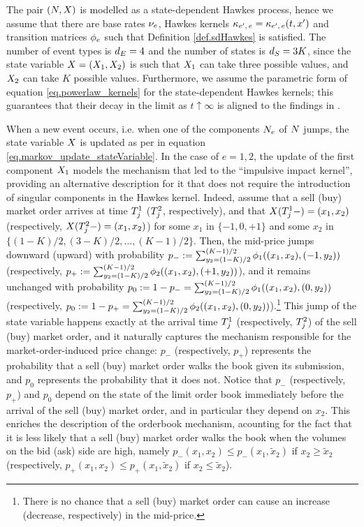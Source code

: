 \documentclass[10pt]{article}
\begin{document}
The pair $(\multiCountingProc, \stateVariable)$ is modelled as a state-dependent Hawkes process, hence we assume that there are base rates $\baseRate_e$, Hawkes kernels $\hawkesKernel\subscriptee=\hawkesKernel\subscriptee(t, \xone)$ and transition matrices $\transProb_e$ such that  Definition \ref{def.sdHawkes} is satisfied. The number of event types is $\numEventTypes = 4$ and the number of states is $\numStates = 3K$, since the state variable $\stateVariable = (\stateVariable_1, \stateVariable_2)$ is such that $\stateVariable_1$ can take three possible values, and $\stateVariable_2$ can take $K$ possible values. Furthermore, we assume the parametric form of equation \eqref{eq.powerlaw_kernels} for the state-dependent Hawkes kernels; this guarantees that their decay in the limit as $t\uparrow\infty$ is aligned to the findings in \citealp{BM14haw}. 

When a new event occurs, i.e. when one of the components $\countingProc$ of $\multiCountingProc$ jumps, the state variable $\stateVariable$ is updated as per in equation \eqref{eq.markov_update_stateVariable}. In the case of $e=1,2$, the update of the first component $\stateVariable_1$ models the mechanism that led to the ``impulsive impact kernel'', providing an alternative description for it that does not require the introduction of singular components in the Hawkes kernel. Indeed, assume that a sell (buy) market order arrives at time $\arrivalTimes[1]_j$ ($\arrivalTimes[2]_j$, respectively), and that $\stateVariable(\arrivalTimes[1]_j -) = (x_1,x_2)$ (respectively, $\stateVariable(\arrivalTimes[2]_j -) = (x_1,x_2)$) for some $x_1$ in $\lbrace -1, 0, +1\rbrace$ and some $x_2$ in $\lbrace (1-K)/2, (3-K)/2, \dots, (K-1)/2 \rbrace$. Then, the mid-price jumps downward (upward) with probability $p_{-}:=\sum_{y_2 = (1-K)/2}^{(K-1)/2} \transProb_{1}((x_1, x_2), (-1,y_2))$ (respectively, $p_{+}:=\sum_{y_2 = (1-K)/2}^{(K-1)/2} \transProb_{2}((x_1, x_2), (+1,y_2))$), and it remains unchanged with probability $p_{0}:=1-p_{-}=\sum_{y_2 = (1-K)/2}^{(K-1)/2} \transProb_{1}((x_1, x_2), (0,y_2))$  (respectively, $p_{0}:=1-p_{+}=\sum_{y_2 = (1-K)/2}^{(K-1)/2} \transProb_{2}((x_1, x_2), (0,y_2))$).\footnote{ There is no chance that a sell (buy) market order can cause an increase (decrease, respectively) in the mid-price.} This jump of the state variable happens exactly at the arrival time $\arrivalTimes[1]_j$ (respectively, $\arrivalTimes[2]_j$)  of the sell (buy) market order, and it naturally captures the mechanism responsible for the market-order-induced price change: $p_{-}$ (respectively, $p_{+}$) represents the probability that a sell (buy) market order  walks the book given its submission, and $p_{0}$  represents the probability that it does not. Notice that $p_{-}$ (respectively, $p_{+}$) and $p_{0}$ depend on the state of the limit order book immediately before the arrival of the sell (buy) market order, and in particular they depend on $x_2$. This enriches the description of the orderbook mechanism, acounting for the fact that it is less likely that a sell (buy) market order walks the book when the volumes on the bid (ask) side are high, namely $p_{-}(x_1,x_2) \leq p_{-}(x_1,\tilde{x}_2)$ if $x_2\geq \tilde{x}_2$ (respectively, $p_{+}(x_1,x_2) \leq p_{+}(x_1,\tilde{x}_2)$ if $x_2\leq \tilde{x}_2$).
\end{document}
